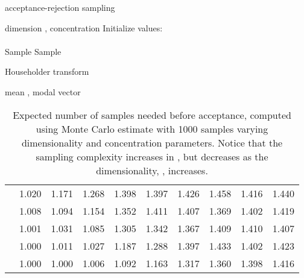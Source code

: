 \documentclass[letterpaper]{article}
\begin{document}
\begin{minipage}[t]{8cm}
  \vspace{0pt}  
\begin{algorithm}[H]
    \centering
   \caption{ acceptance-rejection sampling}
   \label{alg:g-sample}
\begin{algorithmic}
     dimension , concentration 
    \STATE Initialize values:
    \STATE \\
    \STATE \\
    \STATE 
    \REPEAT
    \STATE Sample 
    \STATE 
    \STATE 
    \STATE Sample 
    \UNTIL{}
\end{algorithmic}
\end{algorithm}
\end{minipage}\hspace{2 cm}
\begin{minipage}[t]{6cm}
  \vspace{0pt}
\begin{algorithm}[H]
   \caption{Householder transform}
   \label{alg:householder-transform}
\begin{algorithmic}
     mean , modal vector 
    \STATE 
    \STATE 
    \STATE 
\end{algorithmic}
\end{algorithm}
\end{minipage}

\begin{table}[H]
  \centering
    \caption{Expected number of samples needed before acceptance, computed using Monte Carlo estimate with 1000 samples varying dimensionality and concentration parameters. Notice that the sampling complexity increases in , but decreases as the dimensionality, , increases.}
    \bigskip
    \begin{tabular}{l|ccccccccc}
    \toprule
    &  &  &  &  &  &  &  &  &  \\
    \midrule
 & 1.020 & 1.171 & 1.268 & 1.398 & 1.397 & 1.426 & 1.458 & 1.416 & 1.440\\
 & 1.008 & 1.094 & 1.154 & 1.352 & 1.411 & 1.407 & 1.369 & 1.402 & 1.419\\
 & 1.001 & 1.031 & 1.085 & 1.305 & 1.342 & 1.367 & 1.409 & 1.410 & 1.407\\
 & 1.000 & 1.011 & 1.027 & 1.187 & 1.288 & 1.397 & 1.433 & 1.402 & 1.423\\
 & 1.000 & 1.000 & 1.006 & 1.092 & 1.163 & 1.317 & 1.360 & 1.398 & 1.416\\
    \bottomrule
    \end{tabular}
\end{table}
\end{document}
